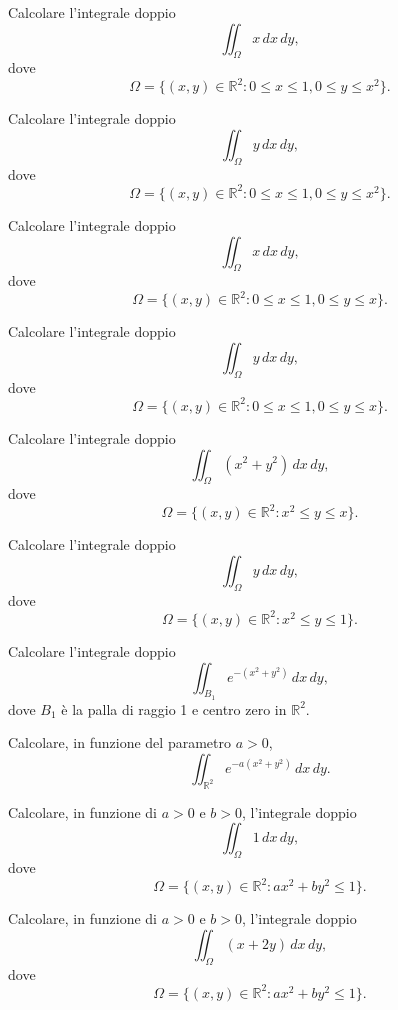 \begin{exercise}
	Calcolare l'integrale doppio
	\[
	\iint_\Omega x \, dx \, dy,
	\]
	dove
	\[
	\Omega = \{(x, y) \in \mathbb{R}^2 : 0 \leq x \leq 1, 0 \leq y \leq x^2\}.
	\]
\end{exercise}
\begin{exercise}
	Calcolare l'integrale doppio
	\[
	\iint_\Omega y \, dx \, dy,
	\]
	dove
	\[
	\Omega = \{(x, y) \in \mathbb{R}^2 : 0 \leq x \leq 1, 0 \leq y \leq x^2\}.
	\]
\end{exercise}
\begin{exercise}
	Calcolare l'integrale doppio
	\[
	\iint_\Omega x \, dx \, dy,
	\]
	dove
	\[
	\Omega = \{(x, y) \in \mathbb{R}^2 : 0 \leq x \leq 1, 0 \leq y \leq x\}.
	\]
\end{exercise}
\begin{exercise}
	Calcolare l'integrale doppio
	\[
	\iint_\Omega y \, dx \, dy,
	\]
	dove
	\[
	\Omega = \{(x, y) \in \mathbb{R}^2 : 0 \leq x \leq 1, 0 \leq y \leq x\}.
	\]
\end{exercise}
\begin{exercise}
	Calcolare l'integrale doppio
	\[
	\iint_\Omega (x^2 + y^2) \, dx \, dy,
	\]
	dove
	\[
	\Omega = \{(x, y) \in \mathbb{R}^2 : x^2 \leq y \leq x\}.
	\]
\end{exercise}
\begin{exercise}
	Calcolare l'integrale doppio
	\[
	\iint_\Omega y \, dx \, dy,
	\]
	dove
	\[
	\Omega = \{(x, y) \in \mathbb{R}^2 : x^2 \leq y \leq 1\}.
	\]
\end{exercise}
\begin{exercise}
	Calcolare l'integrale doppio
	\[
	\iint_{B_1} e^{-(x^2 + y^2)} \, dx \, dy,
	\]
	dove \( B_1 \) è la palla di raggio 1 e centro zero in \( \mathbb{R}^2 \).
\end{exercise}
\begin{exercise}
	Calcolare, in funzione del parametro \( a > 0 \),
	\[
	\iint_{\mathbb{R}^2} e^{-a(x^2 + y^2)} \, dx \, dy.
	\]
\end{exercise}
\begin{exercise}
	Calcolare, in funzione di \( a > 0 \) e \( b > 0 \), l'integrale doppio
	\[
	\iint_\Omega 1 \, dx \, dy,
	\]
	dove
	\[
	\Omega = \{(x, y) \in \mathbb{R}^2 : ax^2 + by^2 \leq 1\}.
	\]
\end{exercise}
\begin{exercise}
	Calcolare, in funzione di \( a > 0 \) e \( b > 0 \), l'integrale doppio
	\[
	\iint_\Omega (x + 2y) \, dx \, dy,
	\]
	dove
	\[
	\Omega = \{(x, y) \in \mathbb{R}^2 : ax^2 + by^2 \leq 1\}.
	\]
\end{exercise}
